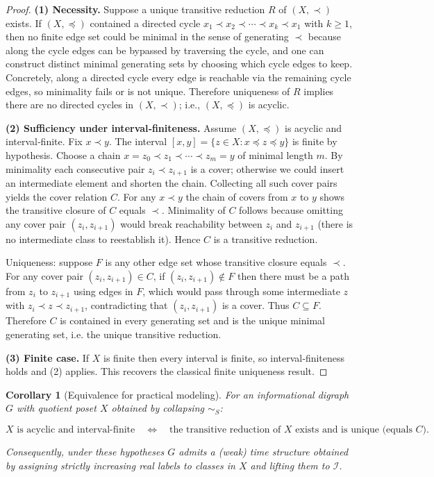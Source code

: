 \documentclass[11pt]{article}
\newtheorem{corollary}[definition]{Corollary}
\begin{document}
\begin{proof}
\textbf{(1) Necessity.} Suppose a unique transitive reduction \(R\) of
\((X,\prec)\) exists. If \((X,\preceq)\) contained a directed cycle
\(x_1\prec x_2\prec\cdots\prec x_k\prec x_1\) with \(k\ge 1\), then no
finite edge set could be minimal in the sense of generating \(\prec\)
because along the cycle edges can be bypassed by traversing the cycle,
and one can construct distinct minimal generating sets by choosing which
cycle edges to keep. Concretely, along a directed cycle every edge is
reachable via the remaining cycle edges, so minimality fails or is not
unique. Therefore uniqueness of \(R\) implies there are no directed
cycles in \((X,\prec)\); i.e., \((X,\preceq)\) is acyclic.

\textbf{(2) Sufficiency under interval‑finiteness.} Assume \((X,\preceq)\)
is acyclic and interval‑finite. Fix \(x\prec y\). The interval
\([x,y]=\{z\in X: x\preceq z\preceq y\}\) is finite by hypothesis. Choose
a chain \(x=z_0\prec z_1\prec\cdots\prec z_m=y\) of minimal length \(m\).
By minimality each consecutive pair \(z_i\prec z_{i+1}\) is a cover;
otherwise we could insert an intermediate element and shorten the chain.
Collecting all such cover pairs yields the cover relation \(C\). For any
\(x\prec y\) the chain of covers from \(x\) to \(y\) shows the transitive
closure of \(C\) equals \(\prec\). Minimality of \(C\) follows because
omitting any cover pair \((z_i,z_{i+1})\) would break reachability
between \(z_i\) and \(z_{i+1}\) (there is no intermediate class to
reestablish it). Hence \(C\) is a transitive reduction.

Uniqueness: suppose \(F\) is any other edge set whose transitive closure
equals \(\prec\). For any cover pair \((z_i,z_{i+1})\in C\), if
\((z_i,z_{i+1})\notin F\) then there must be a path from \(z_i\) to
\(z_{i+1}\) using edges in \(F\), which would pass through some
intermediate \(z\) with \(z_i\prec z\prec z_{i+1}\), contradicting that
\((z_i,z_{i+1})\) is a cover. Thus \(C\subseteq F\). Therefore \(C\) is
contained in every generating set and is the unique minimal generating
set, i.e. the unique transitive reduction.

\textbf{(3) Finite case.} If \(X\) is finite then every interval is finite,
so interval‑finiteness holds and (2) applies. This recovers the classical
finite uniqueness result.
\end{proof}

\begin{corollary}[Equivalence for practical modeling]
For an informational digraph \(G\) with quotient poset \(X\) obtained by
collapsing \(\sim_S\):


\[
\text{\(X\) is acyclic and interval‑finite}
\quad\Longleftrightarrow\quad
\text{the transitive reduction of \(X\) exists and is unique (equals \(C\)).}
\]


Consequently, under these hypotheses \(G\) admits a (weak) time structure
obtained by assigning strictly increasing real labels to classes in \(X\)
and lifting them to \(\mathcal I\).
\end{corollary}
\end{document}
